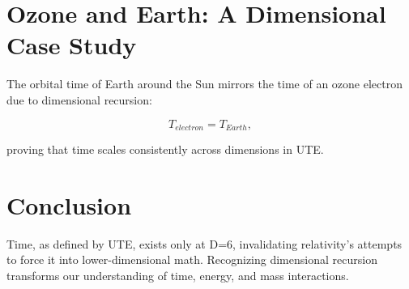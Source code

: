 \documentclass[letterpaper,12pt]{article}
\begin{document}
\section{Ozone and Earth: A Dimensional Case Study}
The orbital time of Earth around the Sun mirrors the time of an ozone electron due to dimensional recursion:

\begin{equation}
    T_{electron} = T_{Earth},
\end{equation}

proving that time scales consistently across dimensions in UTE.

\section{Conclusion}
Time, as defined by UTE, exists only at D=6, invalidating relativity’s attempts to force it into lower-dimensional math. Recognizing dimensional recursion transforms our understanding of time, energy, and mass interactions.
\end{document}
